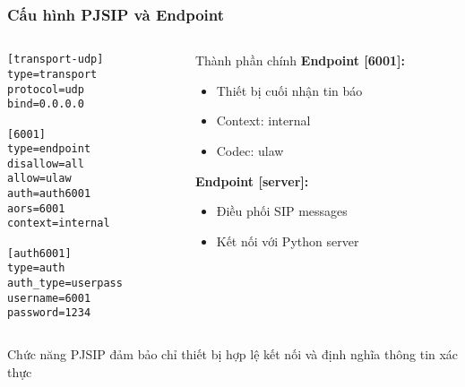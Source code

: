 \begin{frame}[fragile]
\frametitle{Cấu hình PJSIP và Endpoint}

\begin{columns}[t]
\begin{column}{0.55\textwidth}
\begin{verbatim}
[transport-udp]
type=transport
protocol=udp
bind=0.0.0.0

[6001]
type=endpoint
disallow=all
allow=ulaw
auth=auth6001
aors=6001
context=internal

[auth6001]
type=auth
auth_type=userpass
username=6001
password=1234
\end{verbatim}
\end{column}

\begin{column}{0.4\textwidth}
\begin{block}{Thành phần chính}
\textbf{Endpoint [6001]:}
\begin{itemize}
\item Thiết bị cuối nhận tin báo
\item Context: internal
\item Codec: ulaw
\end{itemize}

\textbf{Endpoint [server]:}
\begin{itemize}
\item Điều phối SIP messages
\item Kết nối với Python server
\end{itemize}
\end{block}
\end{column}
\end{columns}

\vspace{0.2cm}
\begin{alertblock}{Chức năng}
PJSIP đảm bảo chỉ thiết bị hợp lệ kết nối và định nghĩa thông tin xác thực
\end{alertblock}

\end{frame}

